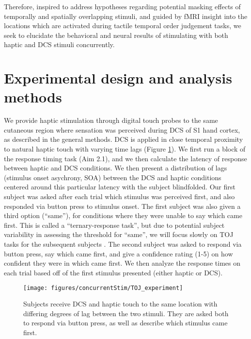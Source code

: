 Therefore, inspired to address hypotheses regarding potential masking effects of temporally and spatially overlapping stimuli, and guided by fMRI insight into the locations which are activated during tactile temporal order judgement tasks, we seek to elucidate the behavioral and neural results of stimulating with both haptic and DCS stimuli concurrently. 

\section{Experimental design and analysis methods}

We provide haptic stimulation through digital touch probes to the same cutaneous region where sensation was perceived during DCS of S1 hand cortex, as described in the general methods. DCS is applied in close temporal proximity to natural haptic touch with varying time lags (Figure \ref{fig:concurrentStimOverview}). We first run a block of the response timing task (Aim 2.1), and we then calculate the latency of response between haptic and DCS conditions. We then present a distribution of lags (stimulus onset asychrony, SOA) between the DCS and haptic conditions centered around this particular latency with the subject blindfolded. Our first subject was asked after each trial which stimulus was perceived first, and also responded via button press to stimulus onset. The first subject was also given a third option (“same”), for conditions where they were unable to say which came first. This is called a “ternary-response task”, but due to potential subject variability in assessing the threshold for “same”, we will focus slowly on TOJ tasks for the subsequent subjects \cite{Spence2010}. The second subject was asked to respond via button press, say which came first, and give a confidence rating (1-5) on how confident they were in which came first. We then analyze the response times on each trial based off of the first stimulus presented (either haptic or DCS).

\begin{figure}[ht]
	\centering
	\texttt{[image: figures/concurrentStim/TOJ\_experiment]}
	\caption[Overview of concurrent haptic and DCS.]{Subjects receive DCS and haptic touch to the same location with differing degrees of lag between the two stimuli. They are asked both to respond via button press, as well as describe which stimulus came first. 
	}
	\label{fig:concurrentStimOverview}
\end{figure}

